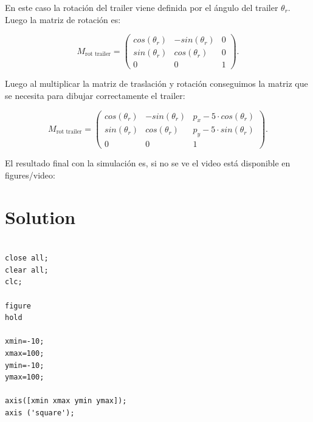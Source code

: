 \documentclass{article}
\begin{document}
\newline
En este caso la rotación del trailer viene definida por el ángulo del trailer $\theta_r$. Luego la matriz de rotación es:\\
\begin{scriptsize}
	\begin{equation*}
		M_{\text{rot trailer}} =
		\begin{pmatrix}
			cos(\theta_r) & -sin(\theta_r)  &0\\
			sin(\theta_r) &cos(\theta_r) &0\\
			0 &0 &1
		\end{pmatrix}.
	\end{equation*}
\end{scriptsize}
\newline
Luego al multiplicar la matriz de traslación y rotación conseguimos la matriz que se necesita para dibujar correctamente el trailer:
\begin{scriptsize}
	\begin{equation*}
		M_{\text{rot trailer}} =
		\begin{pmatrix}
			cos(\theta_r) & -sin(\theta_r)  &p_x - 5·cos(\theta_r) \\
			sin(\theta_r) &cos(\theta_r) &p_y - 5·sin(\theta_r)\\
			0 &0 &1
		\end{pmatrix}.
	\end{equation*}
\end{scriptsize}
\newline
El resultado final con la simulación es, si no se ve el video está disponible en  figures/video:\\
\newpage

\section*{Solution}


\noindent
    \begin{tcolorbox}[
        title={File \texttt{init.m}},
        width=13cm,
    ]
    
\begin{scriptsize}
\begin{verbatim}

close all; 
clear all; 
clc;

figure
hold

xmin=-10;
xmax=100;
ymin=-10;
ymax=100;

axis([xmin xmax ymin ymax]); 
axis ('square');

\end{verbatim}
\end{scriptsize}
\end{tcolorbox}
\end{document}
